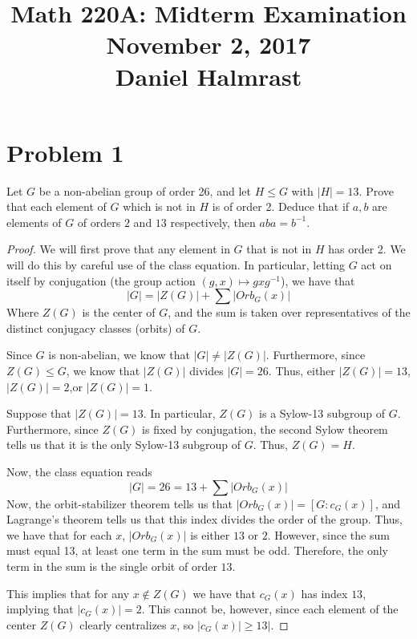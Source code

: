 \documentclass[12pt,reqno]{amsart}
\newcommand{\inv}{^{-1}}
\begin{document}
\title[]{Math 220A: Midterm Examination\\
        November 2, 2017\\
        Daniel Halmrast}
\maketitle
\large
\section*{Problem 1}
Let $G$ be a non-abelian group of order 26, and let $H\leq G$ with $|H|=13$.
Prove that each element of $G$ which is not in $H$ is of order 2. Deduce that
if $a, b$ are elements of $G$ of orders $2$ and $13$ respectively, then
$aba=b\inv$.
\\
\begin{proof}
    We will first prove that any element in $G$ that is not in $H$ has
    order 2. We will do this by careful use of the class equation. In
    particular, letting $G$ act on itself by conjugation (the group action
    $(g,x)\mapsto gxg\inv$), we have that
    \[
        |G| = |Z(G)| + \sum|Orb_G(x)|
    \]
    Where $Z(G)$ is the center of $G$, and the sum is taken over
    representatives of the distinct conjugacy classes (orbits) of $G$.
    
    Since $G$ is non-abelian, we know that $|G|\neq|Z(G)|$. Furthermore, since
    $Z(G)\leq G$, we know that $|Z(G)|$ divides $|G|=26$. Thus, either
    $|Z(G)| = 13$, $|Z(G)| = 2$,or $|Z(G)| = 1$.

    Suppose that $|Z(G)| = 13$. In particular, $Z(G)$ is a Sylow-13 subgroup
    of $G$. Furthermore, since $Z(G)$ is fixed by conjugation, the second Sylow
    theorem tells us that it is the only Sylow-13 subgroup of $G$. Thus,
    $Z(G) = H$.

    Now, the class equation reads
    \[
        |G| = 26 = 13 + \sum|Orb_G(x)|
    \]
    Now, the orbit-stabilizer theorem tells us that $|Orb_G(x)| = [G:c_G(x)]$,
    and Lagrange's theorem tells us that this index divides the order of the
    group. Thus, we have that for each $x$, $|Orb_G(x)|$ is either $13$ or $2$.
    However, since the sum must equal 13, at least one term in the sum must be
    odd. Therefore, the only term in the sum is the single orbit of order $13$.

    This implies that for any $x\not\in Z(G)$ we have that $c_G(x)$ has index
    $13$, implying that $|c_G(x)| = 2$. This cannot be, however, since each
    element of the center $Z(G)$ clearly centralizes $x$, so $|c_G(x)|\geq 13|$.


\end{proof}
\end{document}
